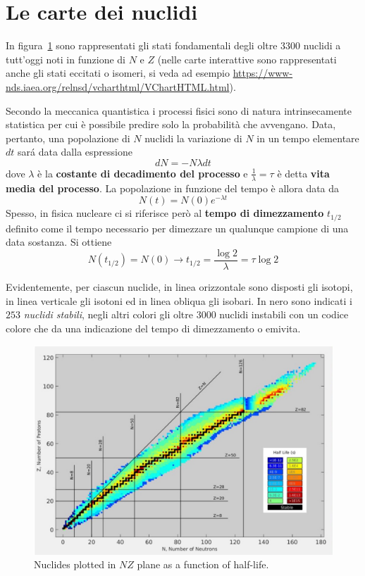 \section{Le carte dei nuclidi}\label{sec:le-carte-dei-nuclidi}
In figura~\ref{fig:nuclides-chart-emilife} sono rappresentati gli stati fondamentali degli oltre 3300 nuclidi a tutt’oggi
noti in funzione di $ N $ e $ Z $ (nelle carte interattive sono rappresentati anche gli stati eccitati o isomeri,
si veda ad esempio \url{https://www-nds.iaea.org/relnsd/vcharthtml/VChartHTML.html}).
\begin{marginfigure}
    Secondo la meccanica quantistica i processi fisici sono di natura intrinsecamente statistica per cui è possibile predire
    solo la probabilità che avvengano.
    Data, pertanto, una popolazione di $ N $ nuclidi la variazione di $ N $ in un tempo elementare $ dt $ sará data dalla
    espressione
    \[
        dN = - N \lambda dt
    \]
    dove $ \lambda $ è la \textbf{costante di decadimento del processo} e $ \frac{1}{\lambda} = \tau $ è detta \textbf{vita
    media del processo}.
    La popolazione in funzione del tempo è allora data da
    \[
        N(t) = N(0) e^{- \lambda t}
    \]
    Spesso, in fisica nucleare ci si riferisce però al \textbf{tempo di dimezzamento} $ t_{1/2} $ definito come il tempo
    necessario per dimezzare un qualunque campione di una data sostanza. Si ottiene
    \[
        N(t_{1/2}) = N(0) \to t_{1/2} = \frac{\log 2}{\lambda} = \tau \log 2
    \]
\end{marginfigure}
Evidentemente, per ciascun nuclide, in linea orizzontale sono disposti gli isotopi, in linea verticale gli isotoni ed
in linea obliqua gli isobari.
In nero sono indicati i $253$ \emph{nuclidi stabili}, negli altri colori gli oltre $3000$ nuclidi instabili con un
codice colore che da una indicazione del tempo di dimezzamento o emivita.
\begin{figure}
    \centering
    \includegraphics{../figs/nuclides-chart-emilife}
    \caption{Nuclides plotted in $ NZ $ plane as a function of half-life.}
    \label{fig:nuclides-chart-emilife}
\end{figure}

